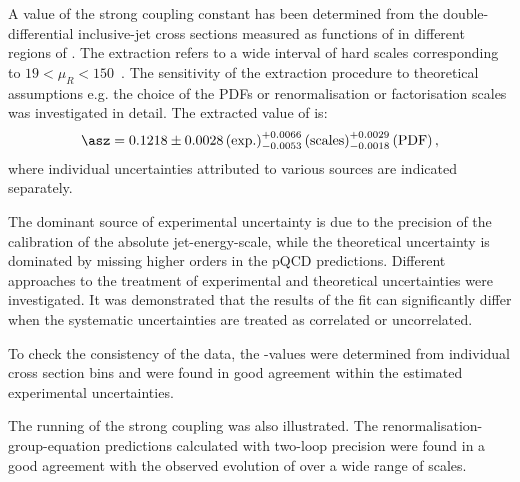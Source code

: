 A value of the strong coupling constant has been determined from the double-differential inclusive-jet cross sections measured as functions of \etjetb in different regions of \qsq. The extraction refers to a wide interval of hard scales corresponding to $19 < \mu_R < 150$~\GeV. The sensitivity of the extraction procedure to theoretical assumptions e.g. the choice of the PDFs or renormalisation or factorisation scales was investigated in detail. The extracted value of \asz is:
\begin{equation}
 \asz = 0.1218 \pm 0.0028\left(\text{exp.}\right)^{+0.0066}_{-0.0053}\left(\text{scales}\right)^{+0.0029}_{-0.0018}\left(\text{PDF}\right),
\end{equation}
where individual uncertainties attributed to various sources are indicated separately. 

The dominant source of experimental uncertainty is due to the precision of the calibration of the absolute jet-energy-scale, while the theoretical uncertainty is dominated by missing higher orders in the pQCD predictions.
Different approaches to the treatment of experimental and theoretical uncertainties were investigated. It was demonstrated that the results of the fit can significantly differ when the systematic uncertainties are treated as correlated or uncorrelated. 

To check the consistency of the data, the \asz-values were determined from individual cross section bins and were found in good agreement within the estimated experimental uncertainties.

The running of the strong coupling was also illustrated. The renormalisation-group-equation predictions calculated with two-loop precision were found in a good agreement with the observed evolution of \as over a wide range of scales.